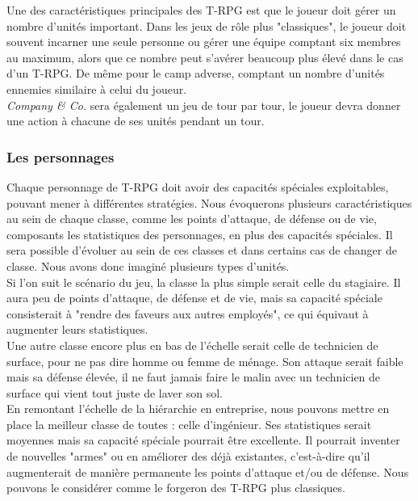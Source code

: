 \documentclass{article}
\begin{document}
Une des caractéristiques principales des T-RPG est que le joueur doit gérer un nombre d'unités important. Dans les jeux de rôle plus "classiques", le joueur doit souvent incarner une seule personne ou gérer une équipe comptant six membres au maximum, alors que ce nombre peut s'avérer beaucoup plus élevé dans le cas d'un T-RPG. De même pour le camp adverse, comptant un nombre d'unités ennemies similaire à celui du joueur.\\

\textit{Company \& Co.} sera également un jeu de tour par tour, le joueur devra donner une action à chacune de ses unités pendant un tour.

\subsubsection{Les personnages}
Chaque personnage de T-RPG doit avoir des capacités spéciales exploitables, pouvant mener à différentes stratégies. Nous évoquerons plusieurs caractéristiques au sein de chaque classe, comme les points d'attaque, de défense ou de vie, composants les statistiques des personnages, en plus des capacités spéciales. Il sera possible d'évoluer au sein de ces classes et dans certains cas de changer de classe. Nous avons donc imaginé plusieurs types d'unités.\\

Si l'on suit le scénario du jeu, la classe la plus simple serait celle du stagiaire. Il aura peu de points d'attaque, de défense et de vie, mais sa capacité spéciale consisterait à "rendre des faveurs aux autres employés", ce qui équivaut à augmenter leurs statistiques.\\

Une autre classe encore plus en bas de l'échelle serait celle de technicien de surface, pour ne pas dire homme ou femme de ménage. Son attaque serait faible mais sa défense élevée, il ne faut jamais faire le malin avec un technicien de surface qui vient tout juste de laver son sol.\\

En remontant l'échelle de la hiérarchie en entreprise, nous pouvons mettre en place la meilleur classe de toutes : celle d'ingénieur. Ses statistiques serait moyennes mais sa capacité spéciale pourrait être excellente. Il pourrait inventer de nouvelles "armes" ou en améliorer des déjà existantes, c'est-à-dire qu'il augmenterait de manière permanente les points d'attaque et/ou de défense. Nous pouvons le considérer comme le forgeron des T-RPG plus classiques.\\ 
\end{document}
